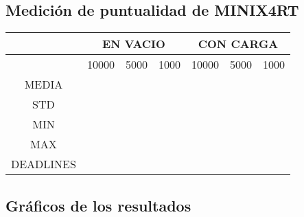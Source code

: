 \subsection{Medición de puntualidad de MINIX4RT}
\begin{tabular}{|c|c|c|c|c|c|c|}
\hline
&\multicolumn{3}{|c|}{EN VACIO}&\multicolumn{3}{|c|}{CON CARGA}\\
\hline
&10000&5000&1000&10000&5000&1000\\
\hline
MEDIA&&&&&&\\
\hline
STD&&&&&&\\
\hline
MIN&&&&&&\\
\hline
MAX&&&&&&\\
\hline
DEADLINES&&&&&&\\
\hline
\end{tabular}

\subsection{Gráficos de los resultados}

